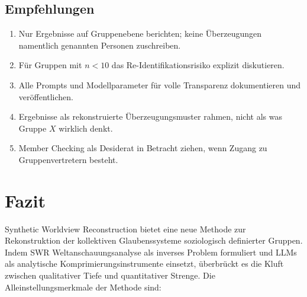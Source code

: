 \documentclass[11pt,a4paper]{article}
\begin{document}
\subsection{Empfehlungen}

\begin{enumerate}[nosep]
  \item Nur Ergebnisse auf Gruppenebene berichten; keine \"Uberzeugungen namentlich genannten Personen zuschreiben.
  \item F\"ur Gruppen mit $n < 10$ das Re-Identifikationsrisiko explizit diskutieren.
  \item Alle Prompts und Modellparameter f\"ur volle Transparenz dokumentieren und ver\"offentlichen.
  \item Ergebnisse als \glqq{}rekonstruierte \"Uberzeugungsmuster\grqq{} rahmen, nicht als \glqq{}was Gruppe $X$ wirklich denkt\grqq{}.
  \item Member Checking \citep{SoysalTurkmen2024} als Desiderat in Betracht ziehen, wenn Zugang zu Gruppenvertretern besteht.
\end{enumerate}


\section{Fazit}
\label{sec:conclusion}

Synthetic Worldview Reconstruction bietet eine neue Methode zur Rekonstruktion der kollektiven Glaubenssysteme soziologisch definierter Gruppen. Indem SWR Weltanschauungsanalyse als inverses Problem formuliert und LLMs als analytische Komprimierungsinstrumente einsetzt, \"uberbr\"uckt es die Kluft zwischen qualitativer Tiefe und quantitativer Strenge. Die Alleinstellungsmerkmale der Methode sind:
\end{document}
